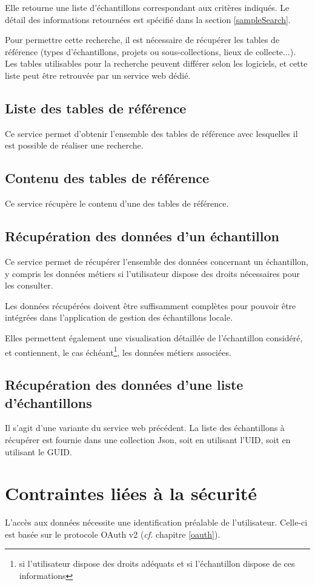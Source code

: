 Elle retourne une liste d'échantillons correspondant aux critères indiqués. Le détail des informations retournées est spécifié dans la section \ref{sampleSearch}.

Pour permettre cette recherche, il est nécessaire de récupérer les tables de référence (types d'échantillons, projets ou sous-collections, lieux de collecte...). Les tables utilisables pour la recherche peuvent différer selon les logiciels, et cette liste peut être retrouvée par un service web dédié.

\subsection{Liste des tables de référence}
Ce service permet d'obtenir l'ensemble des tables de référence avec lesquelles il est possible de réaliser une recherche.

\subsection{Contenu des tables de référence}
Ce service récupère le contenu d'une des tables de référence.

\subsection{Récupération des données d'un échantillon}
Ce service permet de récupérer l'ensemble des données concernant un échan\-tillon, y compris les données \og métiers \fg{} si l'utilisateur dispose des droits néces\-saires pour les consulter.

Les données récupérées doivent être suffisamment complètes pour pouvoir être intégrées dans l'application de gestion des échantillons locale.

Elles permettent également une visualisation détaillée de l'échantillon consi\-déré, et contiennent, le cas échéant\footnote{si l'utilisateur dispose des droits adéquats et si l'échantillon dispose de ces informations}, les données \og métiers \fg{} associées.

\subsection{Récupération des données d'une liste d'échantillons}

Il s'agit d'une variante du service web précédent. La liste des échantillons à récupérer est fournie dans une collection Json, soit en utilisant l'UID, soit en utilisant le GUID.

\section{Contraintes liées à la sécurité}

L'accès aux données nécessite une identification préalable de l'utilisateur. Celle-ci est basée sur le protocole OAuth v2 (\textit{cf.} chapitre \ref{oauth}).

